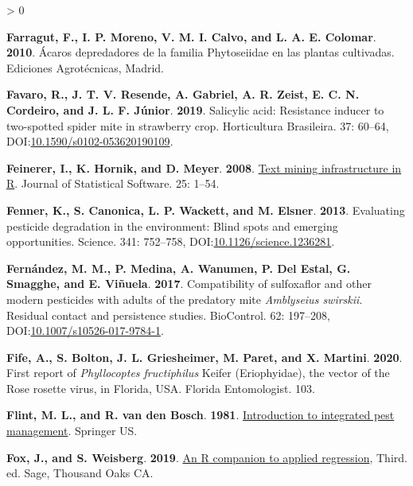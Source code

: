 \documentclass{ufdissertation}[overrideChapters] %
\newlength{\cslhangindent}
\newenvironment{CSLReferences}[2] %
 {%
  \setlength{\parindent}{0pt}
  \ifodd #1 \everypar{\setlength{\hangindent}{\cslhangindent}}\ignorespaces\fi
  \ifnum #2 > 0
  \setlength{\parskip}{#2\baselineskip}
  \fi
 }%
 {}
\begin{document}
{\begin{CSLReferences}{1}{1}
\leavevmode{}%
\textbf{Farragut, F., I. P. Moreno, V. M. I. Calvo, and L. A. E. Colomar}. \textbf{2010}. {Á}caros depredadores de la familia {Phytoseiidae} en las plantas cultivadas. Ediciones Agrot{é}cnicas, Madrid.

\leavevmode{}%
\textbf{Favaro, R., J. T. V. Resende, A. Gabriel, A. R. Zeist, E. C. N. Cordeiro, and J. L. F. Júnior}. \textbf{2019}. Salicylic acid: Resistance inducer to two-spotted spider mite in strawberry crop. Horticultura Brasileira. 37: 60--64, DOI:\href{https://doi.org/10.1590/s0102-053620190109}{10.1590/s0102-053620190109}.

\leavevmode{}%
\textbf{Feinerer, I., K. Hornik, and D. Meyer}. \textbf{2008}. \href{https://www.jstatsoft.org/v25/i05/}{Text mining infrastructure in {R}}. Journal of Statistical Software. 25: 1--54.

\leavevmode{}%
\textbf{Fenner, K., S. Canonica, L. P. Wackett, and M. Elsner}. \textbf{2013}. Evaluating pesticide degradation in the environment: Blind spots and emerging opportunities. Science. 341: 752--758, DOI:\href{https://doi.org/10.1126/science.1236281}{10.1126/science.1236281}.

\leavevmode{}%
\textbf{Fernández, M. M., P. Medina, A. Wanumen, P. Del Estal, G. Smagghe, and E. Viñuela}. \textbf{2017}. Compatibility of sulfoxaflor and other modern pesticides with adults of the predatory mite {\emph{Amblyseius swirskii}}. Residual contact and persistence studies. {BioControl}. 62: 197--208, DOI:\href{https://doi.org/10.1007/s10526-017-9784-1}{10.1007/s10526-017-9784-1}.

\leavevmode{}%
\textbf{Fife, A., S. Bolton, J. L. Griesheimer, M. Paret, and X. Martini}. \textbf{2020}. First report of {\emph{Phyllocoptes fructiphilus}} {Keifer} ({Eriophyidae}), the vector of the {Rose rosette virus}, in {Florida}, {USA}. Florida Entomologist. 103.

\leavevmode{}%
\textbf{Flint, M. L., and R. van den Bosch}. \textbf{1981}. \href{https://doi.org/10.1007/978-1-4615-9212-9}{Introduction to integrated pest management}. Springer {US}.

\leavevmode{}%
\textbf{Fox, J., and S. Weisberg}. \textbf{2019}. \href{https://socialsciences.mcmaster.ca/jfox/Books/Companion/}{An {R} companion to applied regression}, Third. ed. Sage, Thousand Oaks {CA}.


\end{CSLReferences}}
\end{document}
